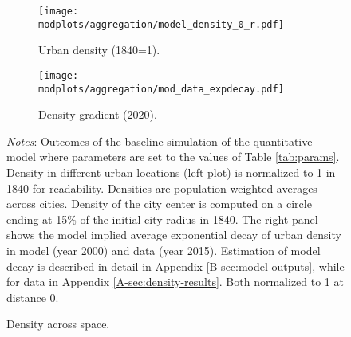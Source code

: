 \documentclass[./20250130-paper.tex]{subfiles}
\begin{document}
\begin{figure}[hpb]
	\begin{adjustbox}{center}	
		\begin{subfigure}{\ptwo\textwidth}
			\texttt{[image: \\modplots/aggregation/model\_density\_0\_r.pdf]}
			\caption{Urban density (1840=1).\label{fig:model-density2}}
		\end{subfigure}
		\hspace{0.1cm}
		\begin{subfigure}{\ptwo\textwidth}
			\texttt{[image: \\modplots/aggregation/mod\_data\_expdecay.pdf]}
			\caption{Density gradient (2020).\label{fig:model-gradient}}
		\end{subfigure}	
	\end{adjustbox}		
	\caption{Density across space.\label{fig:model-densityspace}}
	{\footnotesize \textit{Notes}: Outcomes of the baseline simulation of the quantitative model where parameters are set to the values of Table \ref{tab:params}. Density in different urban locations (left plot) is normalized to 1 in 1840 for readability. Densities are population-weighted averages across cities. Density of the city center is computed on a circle ending at 15\% of the initial city radius in 1840. The right panel shows the model implied average exponential decay of urban density in model (year 2000) and data (year 2015). Estimation of model decay is described in detail in Appendix \ref{B-sec:model-outputs}, while for data in Appendix \ref{A-sec:density-results}. Both normalized to 1 at distance 0.}
\end{figure}
\end{document}
